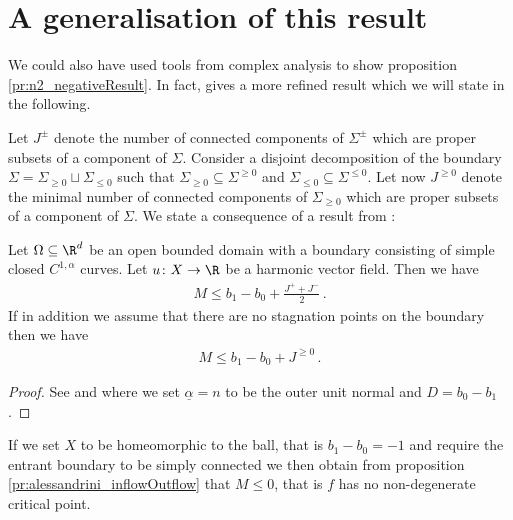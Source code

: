 \section{A generalisation of this result}


We could also have used tools from complex analysis to show proposition \ref{pr:n2_negativeResult}.
In fact, \cite{Alessandrini1992} gives a more refined result which we will state in the
following.

Let $J^\pm$ denote the number of connected components of $\Sigma^\pm$ which are proper
subsets of a component of $\Sigma$.
Consider a disjoint decomposition of the boundary $\Sigma=\Sigma_{\geq0}\sqcup\Sigma_{\leq0}$ such
that $\Sigma_{\geq0}\subseteq\Sigma^{\geq0}$ and $\Sigma_{\leq0}\subseteq\Sigma^{\leq0}$.
Let now $J^{\geq0}$ denote the minimal number of connected components of $\Sigma_{\geq0}$ 
which are proper subsets of a component of $\Sigma$.
We state a consequence of a result from \cite[Theorem 2.1 and 2.2]{Alessandrini1992}:
\begin{proposition}\label{pr:alessandrini_inflowOutflow}
  Let $\Omega\subseteq\R^d$ be an open bounded domain with a boundary consisting of simple closed $C^{1,\alpha}$ curves.
  Let $u\colon X\to \R$ be a harmonic vector field.
  Then we have
  \begin{align*}
    M\leq b_1-b_0+\frac{J^++J^-}{2}\,.
  \end{align*}
  If in addition we assume that there are no stagnation points on the boundary then we have
  \begin{align*}
    M\leq b_1-b_0+J^{\geq0}\,.
  \end{align*}
\end{proposition}
\begin{proof}
  See \cite[Theorem 2.1]{Alessandrini1992} and \cite[Theorem 2.2]{Alessandrini1992} where we set $\underline{\alpha}=n$ to be the outer unit normal and $D=b_0-b_1$.
\end{proof}
If we set $X$ to be homeomorphic to the ball, that is $b_1-b_0=-1$ and require the entrant
boundary to be simply connected we then obtain from proposition \ref{pr:alessandrini_inflowOutflow} that $M\leq0$, 
that is $f$ has no non-degenerate critical point.


